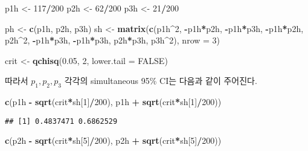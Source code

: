 \documentclass[
]{article}
\newenvironment{Shaded}{\begin{snugshade}}{\end{snugshade}}
\newcommand{\AttributeTok}[1]{\textcolor[rgb]{0.13,0.29,0.53}{#1}}
\newcommand{\ConstantTok}[1]{\textcolor[rgb]{0.56,0.35,0.01}{#1}}
\newcommand{\DecValTok}[1]{\textcolor[rgb]{0.00,0.00,0.81}{#1}}
\newcommand{\FloatTok}[1]{\textcolor[rgb]{0.00,0.00,0.81}{#1}}
\newcommand{\FunctionTok}[1]{\textcolor[rgb]{0.13,0.29,0.53}{\textbf{#1}}}
\newcommand{\NormalTok}[1]{#1}
\newcommand{\OtherTok}[1]{\textcolor[rgb]{0.56,0.35,0.01}{#1}}
\newcommand{\SpecialCharTok}[1]{\textcolor[rgb]{0.81,0.36,0.00}{\textbf{#1}}}
\begin{document}
\begin{Shaded}
\begin{Highlighting}[]
\NormalTok{p1h }\OtherTok{\textless{}{-}} \DecValTok{117}\SpecialCharTok{/}\DecValTok{200}
\NormalTok{p2h }\OtherTok{\textless{}{-}} \DecValTok{62}\SpecialCharTok{/}\DecValTok{200}
\NormalTok{p3h }\OtherTok{\textless{}{-}} \DecValTok{21}\SpecialCharTok{/}\DecValTok{200}

\NormalTok{ph }\OtherTok{\textless{}{-}} \FunctionTok{c}\NormalTok{(p1h, p2h, p3h)}
\NormalTok{sh }\OtherTok{\textless{}{-}} \FunctionTok{matrix}\NormalTok{(}\FunctionTok{c}\NormalTok{(p1h}\SpecialCharTok{\^{}}\DecValTok{2}\NormalTok{, }\SpecialCharTok{{-}}\NormalTok{p1h}\SpecialCharTok{*}\NormalTok{p2h, }\SpecialCharTok{{-}}\NormalTok{p1h}\SpecialCharTok{*}\NormalTok{p3h, }\SpecialCharTok{{-}}\NormalTok{p1h}\SpecialCharTok{*}\NormalTok{p2h, p2h}\SpecialCharTok{\^{}}\DecValTok{2}\NormalTok{, }\SpecialCharTok{{-}}\NormalTok{p1h}\SpecialCharTok{*}\NormalTok{p3h, }\SpecialCharTok{{-}}\NormalTok{p1h}\SpecialCharTok{*}\NormalTok{p3h, p2h}\SpecialCharTok{*}\NormalTok{p3h, p3h}\SpecialCharTok{\^{}}\DecValTok{2}\NormalTok{), }\AttributeTok{nrow =} \DecValTok{3}\NormalTok{)}

\NormalTok{crit }\OtherTok{\textless{}{-}} \FunctionTok{qchisq}\NormalTok{(}\FloatTok{0.05}\NormalTok{, }\DecValTok{2}\NormalTok{, }\AttributeTok{lower.tail =} \ConstantTok{FALSE}\NormalTok{)}
\end{Highlighting}
\end{Shaded}

따라서 \(p_1, p_2, p_3\) 각각의 simultaneous 95\% CI는 다음과 같이
주어진다.

\begin{Shaded}
\begin{Highlighting}[]
\FunctionTok{c}\NormalTok{(p1h }\SpecialCharTok{{-}} \FunctionTok{sqrt}\NormalTok{(crit}\SpecialCharTok{*}\NormalTok{sh[}\DecValTok{1}\NormalTok{]}\SpecialCharTok{/}\DecValTok{200}\NormalTok{), p1h }\SpecialCharTok{+} \FunctionTok{sqrt}\NormalTok{(crit}\SpecialCharTok{*}\NormalTok{sh[}\DecValTok{1}\NormalTok{]}\SpecialCharTok{/}\DecValTok{200}\NormalTok{))}
\end{Highlighting}
\end{Shaded}

\begin{verbatim}
## [1] 0.4837471 0.6862529
\end{verbatim}

\begin{Shaded}
\begin{Highlighting}[]
\FunctionTok{c}\NormalTok{(p2h }\SpecialCharTok{{-}} \FunctionTok{sqrt}\NormalTok{(crit}\SpecialCharTok{*}\NormalTok{sh[}\DecValTok{5}\NormalTok{]}\SpecialCharTok{/}\DecValTok{200}\NormalTok{), p2h }\SpecialCharTok{+} \FunctionTok{sqrt}\NormalTok{(crit}\SpecialCharTok{*}\NormalTok{sh[}\DecValTok{5}\NormalTok{]}\SpecialCharTok{/}\DecValTok{200}\NormalTok{))}
\end{Highlighting}
\end{Shaded}
\end{document}
